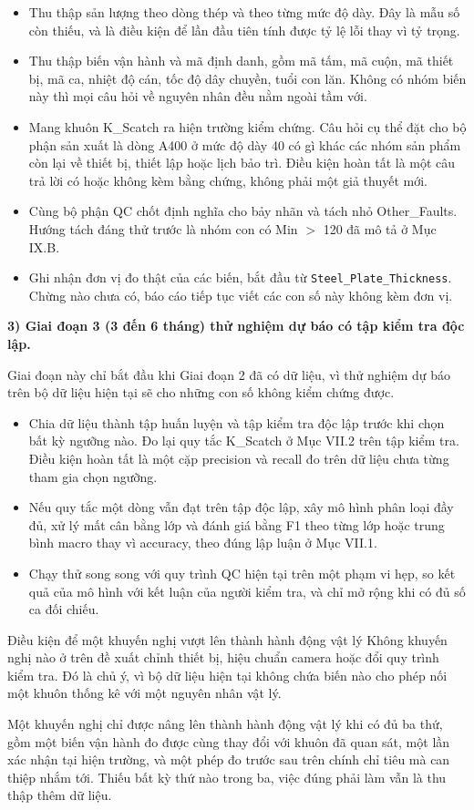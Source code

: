 \documentclass[12pt]{article}
\begin{document}
\begin{itemize}
  \item Thu thập sản lượng theo dòng thép và theo từng mức độ dày. Đây là mẫu số còn thiếu, và là điều kiện để lần đầu tiên tính được tỷ lệ lỗi thay vì tỷ trọng.
  \item Thu thập biến vận hành và mã định danh, gồm mã tấm, mã cuộn, mã thiết bị, mã ca, nhiệt độ cán, tốc độ dây chuyền, tuổi con lăn. Không có nhóm biến này thì mọi câu hỏi về nguyên nhân đều nằm ngoài tầm với.
  \item Mang khuôn K\_Scatch ra hiện trường kiểm chứng. Câu hỏi cụ thể đặt cho bộ phận sản xuất là dòng A400 ở mức độ dày 40 có gì khác các nhóm sản phẩm còn lại về thiết bị, thiết lập hoặc lịch bảo trì. Điều kiện hoàn tất là một câu trả lời có hoặc không kèm bằng chứng, không phải một giả thuyết mới.
  \item Cùng bộ phận QC chốt định nghĩa cho bảy nhãn và tách nhỏ Other\_Faults. Hướng tách đáng thử trước là nhóm con có Min $>$ 120 đã mô tả ở Mục IX.B.
  \item Ghi nhận đơn vị đo thật của các biến, bắt đầu từ \texttt{Steel\_Plate\_Thickness}. Chừng nào chưa có, báo cáo tiếp tục viết các con số này không kèm đơn vị.
\end{itemize}

\noindent
\textbf{3) Giai đoạn 3 (3 đến 6 tháng) thử nghiệm dự báo có tập kiểm tra độc lập.}

\noindent
Giai đoạn này chỉ bắt đầu khi Giai đoạn 2 đã có dữ liệu, vì thử nghiệm dự báo trên bộ dữ liệu hiện tại sẽ cho những con số không kiểm chứng được.

\begin{itemize}
  \item Chia dữ liệu thành tập huấn luyện và tập kiểm tra độc lập trước khi chọn bất kỳ ngưỡng nào. Đo lại quy tắc K\_Scatch ở Mục VII.2 trên tập kiểm tra. Điều kiện hoàn tất là một cặp precision và recall đo trên dữ liệu chưa từng tham gia chọn ngưỡng.
  \item Nếu quy tắc một dòng vẫn đạt trên tập độc lập, xây mô hình phân loại đầy đủ, xử lý mất cân bằng lớp và đánh giá bằng F1 theo từng lớp hoặc trung bình macro thay vì accuracy, theo đúng lập luận ở Mục VII.1.
  \item Chạy thử song song với quy trình QC hiện tại trên một phạm vi hẹp, so kết quả của mô hình với kết luận của người kiểm tra, và chỉ mở rộng khi có đủ số ca đối chiếu.
\end{itemize}

\begin{guidelinebox}{Điều kiện để một khuyến nghị vượt lên thành hành động vật lý}
Không khuyến nghị nào ở trên đề xuất chỉnh thiết bị, hiệu chuẩn camera hoặc đổi quy trình kiểm tra. Đó là chủ ý, vì bộ dữ liệu hiện tại không chứa biến nào cho phép nối một khuôn thống kê với một nguyên nhân vật lý.

Một khuyến nghị chỉ được nâng lên thành hành động vật lý khi có đủ ba thứ, gồm một biến vận hành đo được cùng thay đổi với khuôn đã quan sát, một lần xác nhận tại hiện trường, và một phép đo trước sau trên chính chỉ tiêu mà can thiệp nhắm tới. Thiếu bất kỳ thứ nào trong ba, việc đúng phải làm vẫn là thu thập thêm dữ liệu.
\end{guidelinebox}
\end{document}
